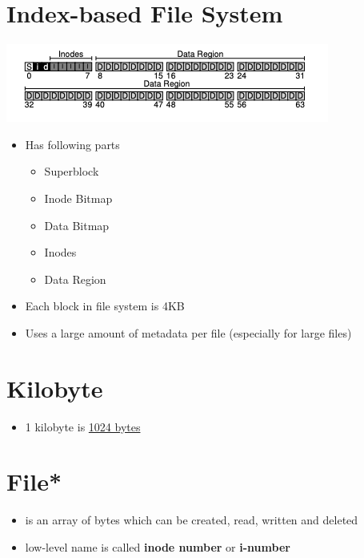 \documentclass[12pt]{article}
\begin{document}
\section{Index-based File System}

\begin{center}
\includegraphics[width=\linewidth]{../images/midterm_2_solution_20.png}
\end{center}

\begin{itemize}
    \item Has following parts

    \begin{itemize}
        \item Superblock
        \item Inode Bitmap
        \item Data Bitmap
        \item Inodes
        \item Data Region
    \end{itemize}

    \item Each block in file system is 4KB
    \item Uses a large amount of metadata per file (especially for large files)
\end{itemize}

\section{Kilobyte}

\begin{itemize}
    \item 1 kilobyte is \underline{1024 bytes}
\end{itemize}

\section{File*}
\begin{itemize}
    \item is an array of bytes which can be created, read, written and deleted
    \item low-level name is called \textbf{inode number} or \textbf{i-number}
\end{itemize}
\end{document}
